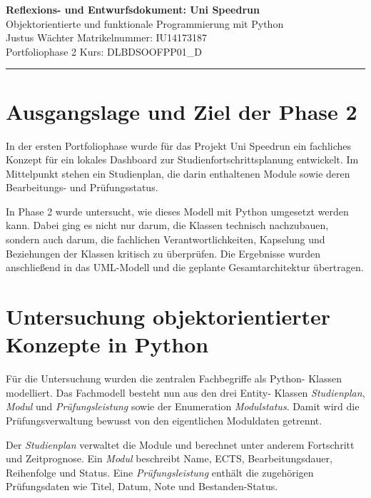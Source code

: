 \documentclass[11pt,a4paper]{article}
\newcommand{\projektname}{Uni Speedrun}
\newcommand{\matrikelnummer}{IU14173187}
\newcommand{\kurs}{DLBDSOOFPP01\_D}
\begin{document}
\begin{center}
    {\Large\textbf{Reflexions- und Entwurfsdokument: \projektname}}\\[2pt]
    {\large Objektorientierte und funktionale Programmierung mit Python}\\[4pt]
    Justus Wächter \hfill Matrikelnummer: \matrikelnummer\\
    Portfoliophase 2 \hfill Kurs: \kurs
\end{center}

\hrule
\vspace{0.2cm}

\section{Ausgangslage und Ziel der Phase 2}

In der ersten Portfoliophase wurde für das Projekt
\glqq Uni Speedrun\grqq{} ein fachliches Konzept für ein lokales
Dashboard zur Studienfortschrittsplanung entwickelt. Im Mittelpunkt
stehen ein Studienplan, die darin enthaltenen Module sowie deren
Bearbeitungs- und Prüfungsstatus.

In Phase 2 wurde untersucht, wie dieses Modell mit Python umgesetzt
werden kann. Dabei ging es nicht nur darum, die Klassen technisch
nachzubauen, sondern auch darum, die fachlichen Verantwortlichkeiten,
Kapselung und Beziehungen der Klassen kritisch zu überprüfen. Die
Ergebnisse wurden anschließend in das UML-Modell und die geplante
Gesamtarchitektur übertragen.

\section{Untersuchung objektorientierter Konzepte in Python}

Für die Untersuchung wurden die zentralen Fachbegriffe als Python-
Klassen modelliert. Das Fachmodell besteht nun aus den drei Entity-
Klassen \textit{Studienplan}, \textit{Modul} und
\textit{Prüfungsleistung} sowie der Enumeration \textit{Modulstatus}.
Damit wird die Prüfungsverwaltung bewusst von den eigentlichen
Moduldaten getrennt.

Der \textit{Studienplan} verwaltet die Module und berechnet unter
anderem Fortschritt und Zeitprognose. Ein \textit{Modul} beschreibt
Name, ECTS, Bearbeitungsdauer, Reihenfolge und Status. Eine
\textit{Prüfungsleistung} enthält die zugehörigen Prüfungsdaten wie
Titel, Datum, Note und Bestanden-Status.
\end{document}
